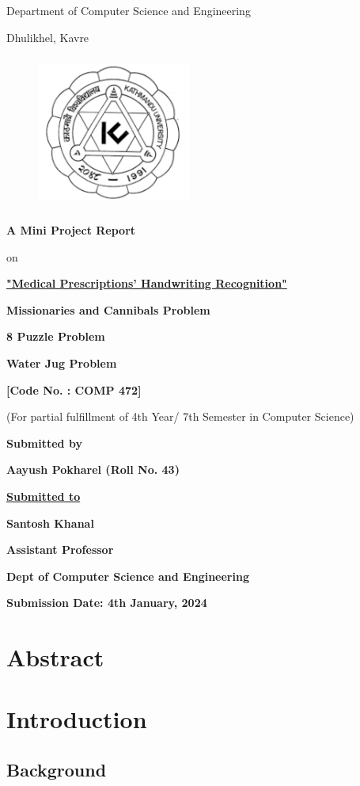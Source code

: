 \documentclass[12pt]{article}
\begin{document}
\thispagestyle{empty}

\section*{}
{\LARGE{}}

\centerline{Department of Computer Science and Engineering}
\centerline{Dhulikhel, Kavre}
\begin{figure}[h]
    \centerline{\includegraphics[width=50.546mm,height=50.546mm]{KU_Logo.png}}
\end{figure}

\centerline{\textbf{A Mini Project Report}}
\centerline{on}
\centerline{\underline{\textbf{"Medical Prescriptions' Handwriting Recognition"}}}
\vspace*{5mm}
\centerline{\textbf{Missionaries and Cannibals Problem}}
\centerline{\textbf{8 Puzzle Problem}}
\centerline{\textbf{Water Jug Problem}}

\vspace*{8mm}

\centerline{\textbf{[Code No. : COMP 472]}}
\centerline{(For partial fulfillment of 4th Year/ 7th Semester in Computer Science)}

\vspace*{15mm}

\centerline{\textbf{Submitted by}}
\centerline{\textbf{Aayush Pokharel (Roll No. 43)}}

\vspace*{16mm}

\centerline{\underline{\textbf{Submitted to}}}
\centerline{\textbf{Santosh Khanal}}
\centerline{\textbf{Assistant Professor}}
\centerline{\textbf{Dept of Computer Science and Engineering}}
\vspace*{30mm}

\centerline{\textbf{Submission Date: 4th January, 2024}}

\clearpage

\section*{Abstract}
\thispagestyle{empty}
\lipsum[1-2]


\clearpage
\thispagestyle{empty}
\tableofcontents

\clearpage
\thispagestyle{empty}
\listoffigures
\clearpage

\section{Introduction}
\subsection{Background}
\end{document}
